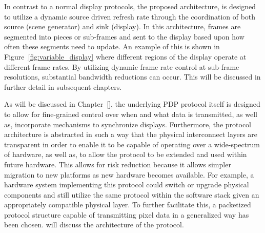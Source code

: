 In contrast to a normal display protocols, the proposed architecture, is designed to utilize a dynamic source driven refresh rate through the coordination of both source (scene generator) and sink (display). In this architecture, frames are segmented into pieces or sub-frames and sent to the display based upon how often these segments need to update. An example of this is shown in Figure~\ref{fig:variable_display} where different regions of the display operate at different frame rates. By utilizing dynamic frame rate control at sub-frame resolutions, substantial bandwidth reductions can occur. This will be discussed in further detail in subsequent chapters.

As will be discussed in Chapter~\ref{}, the underlying PDP protocol itself is designed to allow for fine-grained control over when and what data is transmitted, as well as, incorporate mechanisms to synchronize displays. Furthermore, the protocol architecture is abstracted in such a way that the physical interconnect layers are transparent in order to enable it to be capable of operating over a wide-spectrum of hardware, as well as, to allow the protocol to be extended and used within future hardware. This allows for risk reduction because it allows simpler migration to new platforms as new hardware becomes available. For example, a hardware system implementing this protocol could switch or upgrade physical components and still utilize the same protocol within the software stack given an appropriately compatible physical layer. To further facilitate this, a packetized protocol structure capable of transmitting pixel data in a generalized way has been chosen. will discuss the architecture of the protocol.
